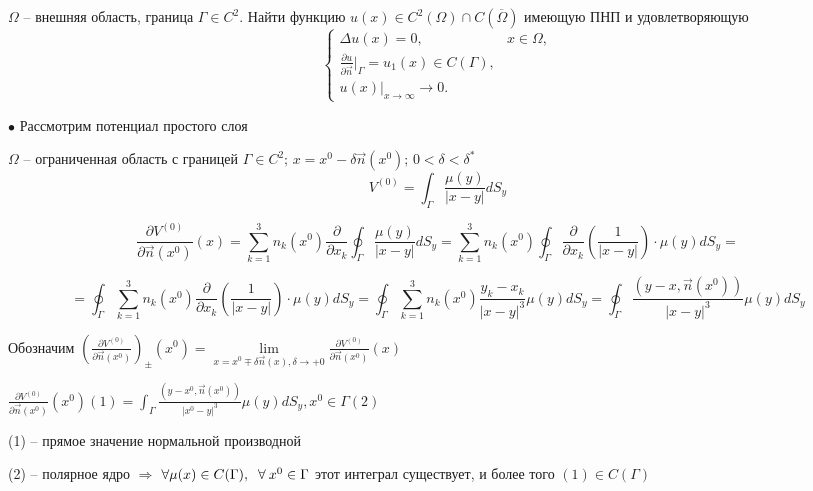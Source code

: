 \begin{theorem}
$\Omega$ -- внешняя область, граница $\Gamma \in C^2$. Найти функцию $u(x) \in C^2(\Omega) \cap C(\overline{\Omega})$ имеющую ПНП и удовлетворяющую 
\begin{equation}
\begin{cases}
\Delta u(x) = 0, &x \in \Omega,
\\
\frac{\partial u}{\partial \vec{n}}\big|_{\Gamma} = u_1(x) \in C(\Gamma),
\\
u(x)|_{x \to \infty} \to 0.
\end{cases}
\end{equation}
\end{theorem}
$\bullet$ Рассмотрим потенциал простого слоя

$\Omega$ -- ограниченная область с границей $\Gamma \in C^2; \, x = x^0 - \delta \vec{n}(x^0); \, 0 < \delta < \delta^*$
  $$V^{(0)} = \int_{\Gamma} \frac{\mu(y)}{|x - y|}dS_y$$

$$\frac{\partial V^{(0)}}{\partial \vec{n}(x^0)}(x) = \sum_{k = 1}^3 n_k(x^0) \frac{\partial}{\partial x_k}\oint_{\Gamma} \frac{\mu(y)}{|x - y|}dS_y = \sum_{k = 1}^3 n_k(x^0) \oint_{\Gamma}  \frac{\partial}{\partial x_k} \left( \frac{1}{|x - y|} \right) \cdot\mu(y)dS_y = $$

$$ = \oint_{\Gamma} \sum_{k = 1}^3 n_k(x^0) \frac{\partial}{\partial x_k} \left( \frac{1}{|x - y|}\right) \cdot \mu(y)dS_y = \oint_{\Gamma} \sum_{k = 1}^3 n_k(x^0) \frac{y_k - x_k}{|x - y|^3}\mu(y)dS_y = \oint_{\Gamma} \frac{(y - x, \vec{n}(x^0))}{|x - y|^3}\mu(y)dS_y$$

Обозначим $\left( \frac{\partial V^{(0)}}{\partial \vec{n}(x^0)} \right)_{\pm}(x^0) = \lim\limits_{x = x^0 \mp \delta \vec{n}(x), \delta \to +0} \frac{\partial V^{(0)}}{\partial \vec{n}(x^0)} (x)$

$\frac{\partial V^{(0)}}{\partial \vec{n}(x^0)}(x^0)(1) = \int_{\Gamma} \frac{(y - x^0, \vec{n}(x^0))}{|x^0 - y|^3}\mu(y)dS_y, x^0 \in \Gamma (2)$

(1) -- прямое значение нормальной производной

(2) -- полярное ядро $\Rightarrow$ $\forall \mu(x) \in C(\Gamma), \;\;\forall\: x^0 \in \Gamma$ этот интеграл существует, и более того $(1) \in C(\Gamma)$

